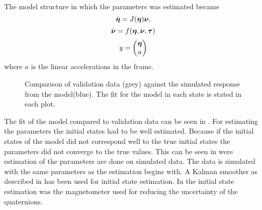 The model structure in which the parameters was estimated became 
\begin{equation}
\dot{\boldsymbol{\eta}} = J(\boldsymbol{\eta}) \boldsymbol{\nu},
\end{equation}
\begin{equation}
\dot{\boldsymbol{\nu}} =  f(\boldsymbol{\eta}, \boldsymbol{\nu}, \boldsymbol{\tau})
\end{equation}
\begin{equation}
y = \begin{pmatrix}
\boldsymbol{\eta} \\
a
\end{pmatrix}
\end{equation}
where $a$ is the linear accelerations in the \abbrROV frame. 
\begin{figure}[tbp]
  \centering
  \qquad
  \qquad
    \qquad
    \qquad
    \qquad
  \caption{\label{fig:angVelCompare}%
    Comparison of validation data (grey) against the simulated response from the model(blue). The fit for the model in each state is stated in each plot.}
\end{figure}
The fit of the model compared to validation data can be seen in . For estimating the parameters the initial states had to be well estimated. Because if the initial states of the model did not correspond well to the true initial states the parameters did not converge to the true values. This can be seen in  were estimation of the parameters are done on simulated data. The data is simulated with the same parameters as the estimation begins with. A Kalman smoother as described in \citet{Wallin} has been used for initial state estimation. In the initial state estimation was the magnetometer used for reducing the uncertainty of the quaternions.

